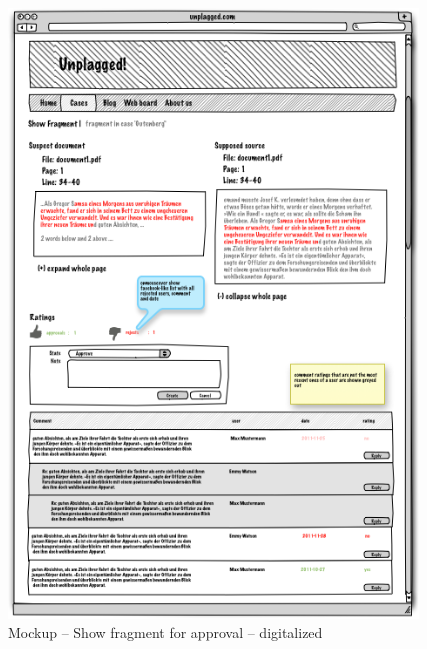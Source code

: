 \begin{appendix}
\begin{figure}[!h]
  \centering
    \includegraphics[width=0.97\textwidth]{mockups/4_show_fragment_for_approval.png}
  \caption{Mockup – Show fragment for approval – digitalized }
  \label{fig:4showFragmentForApprovalMockup}
\end{figure}


\end{appendix}
